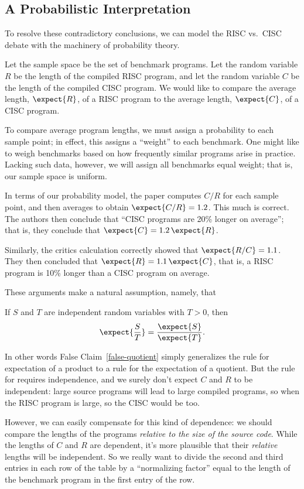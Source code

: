 \subsection{A Probabilistic Interpretation}

To resolve these contradictory conclusions, we can model the RISC vs.\ CISC
debate with the machinery of probability theory.

Let the sample space be the set of benchmark programs.  Let the random
variable $R$ be the length of the compiled RISC program, and let the
random variable $C$ be the length of the compiled CISC program.  We would
like to compare the average length, $\expect{R}$, of a RISC program to the
average length, $\expect{C}$, of a CISC program.

To compare average program lengths, we must assign a probability to
each sample point; in effect, this assigns a ``weight'' to each
benchmark.  One might like to weigh benchmarks based on how frequently
similar programs arise in practice.  Lacking such data, however, we
will assign all benchmarks equal weight; that is, our sample space is
uniform.

In terms of our probability model, the paper computes $C / R$ for each
sample point, and then averages to obtain $\expect{C / R} = 1.2$.  This
much is correct.  The authors then conclude that ``CISC programs are 20\%
longer on average''; that is, they conclude that $\expect{C} = 1.2\,
\expect{R}$.

Similarly, the critics calculation correctly showed that $\expect{R/C} =
1.1$.  They then concluded that $\expect{R} = 1.1 \, \expect{C}$, that is,
a RISC program is 10\% longer than a CISC program on average.

These arguments make a natural assumption, namely, that
\begin{falseclm}\label{false-quotient}
If $S$ and $T$ are independent random variables with $T>0$, then
\[
\expect{\frac{S}{T}} = \frac{\expect{S}}{\expect{T}}.
\]
\end{falseclm}

In other words False Claim~\ref{false-quotient} simply generalizes the
rule for expectation of a product to a rule for the expectation of a
quotient.  But the rule for requires independence, and we surely don't
expect $C$ and $R$ to be independent: large source programs will lead to
large compiled programs, so when the RISC program is large, so the CISC
would be too.

However, we can easily compensate for this kind of dependence: we should
compare the lengths of the programs \emph{relative to the size of the
source code}.  While the lengths of $C$ and $R$ are dependent, it's more
plausible that their \emph{relative} lengths will be independent.  So we
really want to divide the second and third entries in each row of the
table by a ``normalizing factor'' equal to the length of the benchmark
program in the first entry of the row.


